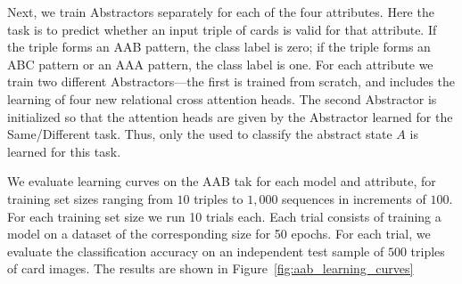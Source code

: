 Next, we train Abstractors separately for each of the four attributes. 
Here the task is to predict whether an input triple of cards is valid for that attribute. 
If the triple forms an AAB pattern, the class label is zero; if the triple forms an ABC 
pattern or an AAA pattern, the class label is one. For each attribute we train 
two different Abstractors---the first is trained from scratch, and includes the learning 
of four new relational cross attention heads. The second Abstractor is 
initialized so that the attention heads are given by the Abstractor learned for the 
Same/Different task. Thus, only the \MLP used to classify the abstract state $A$ is 
learned for this task.

 We evaluate learning curves on the AAB tak for each 
model and attribute, for training set sizes ranging from $10$ triples to $1,000$ sequences in increments of $100$. For each training set size we run 10 trials each. Each trial consists of training a model on a dataset of the corresponding size for 50 epochs. For each trial, we evaluate the classification 
accuracy on an independent test sample of $500$ triples of card images. The results are shown 
in Figure~\ref{fig:aab_learning_curves}

